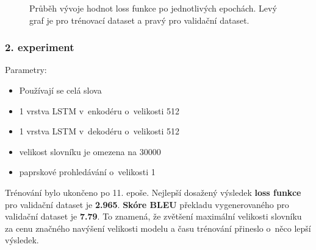 \begin{figure}[H]
    \begin{center}
    \end{center}
	\caption{Průběh vývoje hodnot loss funkce po jednotlivých epochách. Levý graf je pro trénovací dataset a pravý pro validační dataset.}
\end{figure}

\subsubsection{2. experiment}\label{experiment2}
Parametry:
\begin{itemize}
  \item Používají se celá slova
  \item 1 vrstva LSTM v~enkodéru o~velikosti 512
  \item 1 vrstva LSTM v~dekodéru o~velikosti 512
  \item velikost slovníku je omezena na 30000
  \item paprskové prohledávání o~velikosti 1
\end{itemize}

Trénování bylo ukončeno po 11. epoše. Nejlepší dosažený výsledek \textbf{loss funkce} pro validační dataset je \textbf{2.965}. \textbf{Skóre BLEU} překladu vygenerovaného pro validační dataset je \textbf{7.79}. To znamená, že zvětšení maximální velikosti slovníku za cenu značného navýšení velikosti modelu a času trénování přineslo o~něco lepší výsledek.

